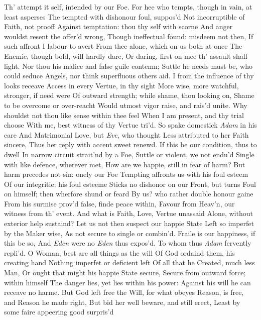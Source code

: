 \documentclass[11pt]{book}
\newcounter {first}
\begin{document}
Th' attempt it self, intended by our Foe. 
For hee who tempts, though in vain, at least asperses 
The tempted with dishonour foul, suppos'd 
Not incorruptible of Faith, not prooff 
Against temptation: thou thy self with scorne 
And anger wouldst resent the offer'd wrong, 
Though ineffectual found: misdeem not then, 
If such affront I labour to avert 
From thee alone, which on us both at once 
The Enemie, though bold, will hardly dare, 
Or daring, first on mee th' assault shall light. 
Nor thou his malice and false guile contemn; 
Suttle he needs must be, who could seduce 
Angels, nor think superfluous others aid. 
I from the influence of thy looks receave 
Access in every Vertue, in thy sight 
More wise, more watchful, stronger, if need were 
Of outward strength; while shame, thou looking on, 
Shame to be overcome or over-reacht 
Would utmost vigor raise, and rais'd unite. 
Why shouldst not thou like sense within thee feel 
When I am present, and thy trial choose 
With me, best witness of thy Vertue tri'd. 
\quad So spake domestick \textit{Adam} in his care 
And Matrimonial Love, but \textit{Eve}, who thought 
Less attributed to her Faith sincere, 
Thus her reply with accent sweet renewd. 
\quad If this be our condition, thus to dwell 
In narrow circuit strait'nd by a Foe, 
Suttle or violent, we not endu'd 
Single with like defence, wherever met, 
How are we happie, still in fear of harm? 
But harm precedes not sin: onely our Foe 
Tempting affronts us with his foul esteem 
Of our integritie: his foul esteeme 
Sticks no dishonor on our Front, but turns 
Foul on himself; then wherfore shund or feard 
By us? who rather double honour gaine 
From his surmise prov'd false, finde peace within, 
Favour from Heav'n, our witness from th' event. 
And what is Faith, Love, Vertue unassaid 
Alone, without exterior help sustaind? 
Let us not then suspect our happie State 
Left so imperfet by the Maker wise, 
As not secure to single or combin'd. 
Fraile is our happiness, if this be so, 
And \textit{Eden} were no \textit{Eden} thus expos'd. 
\quad To whom thus \textit{Adam} fervently repli'd. 
O Woman, best are all things as the will 
Of God ordaind them, his creating hand 
Nothing imperfet or deficient left 
Of all that he Created, much less Man, 
Or ought that might his happie State secure, 
Secure from outward force; within himself 
The danger lies, yet lies within his power: 
Against his will he can receave no harme. 
But God left free the Will, for what obeyes 
Reason, is free, and Reason he made right, 
But bid her well beware, and still erect, 
Least by some faire appeering good surpris'd 
\end{document}
